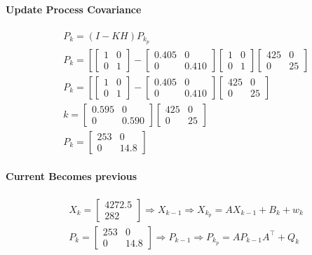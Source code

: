 \paragraph{Update Process Covariance}
$$
\begin{aligned}
&P_k=(I-K H) P_{k_p}\\
&P_k=\left[\left[\begin{array}{ll}
1 & 0 \\
0 & 1
\end{array}\right]-\left[\begin{array}{cc}
0.405 & 0 \\
0 & 0.410
\end{array}\right]\left[\begin{array}{ll}
1 & 0 \\
0 & 1
\end{array}\right]\left[\begin{array}{cc}
425 & 0 \\
0 & 25
\end{array}\right]\right.\\
&P_k=\left[\left[\begin{array}{ll}
1 & 0 \\
0 & 1
\end{array}\right]-\left[\begin{array}{cc}
0.405 & 0 \\
0 & 0.410
\end{array}\right]\left[\begin{array}{cc}
425 & 0 \\
0 & 25
\end{array}\right]\right.\\
&k=\left[\begin{array}{cc}
0.595 & 0 \\
0 & 0.590
\end{array}\right]\left[\begin{array}{cc}
425 & 0 \\
0 & 25
\end{array}\right]\\
&P_k=\left[\begin{array}{cc}
253 & 0 \\
0 & 14.8
\end{array}\right]
\end{aligned}
$$
\paragraph{Current Becomes previous}
$$
\begin{aligned}
&X_k=\left[\begin{array}{c}
4272.5 \\
282
\end{array}\right] \Rightarrow X_{k-1} \Rightarrow X_{k_p}=A X_{k-1}+B_k+w_k \\
&P_k=\left[\begin{array}{cc}
253 & 0 \\
0 & 14.8
\end{array}\right] \Rightarrow P_{k-1} \Rightarrow P_{k_p}=A P_{k-1} A^{\top}+Q_k
\end{aligned}
$$
